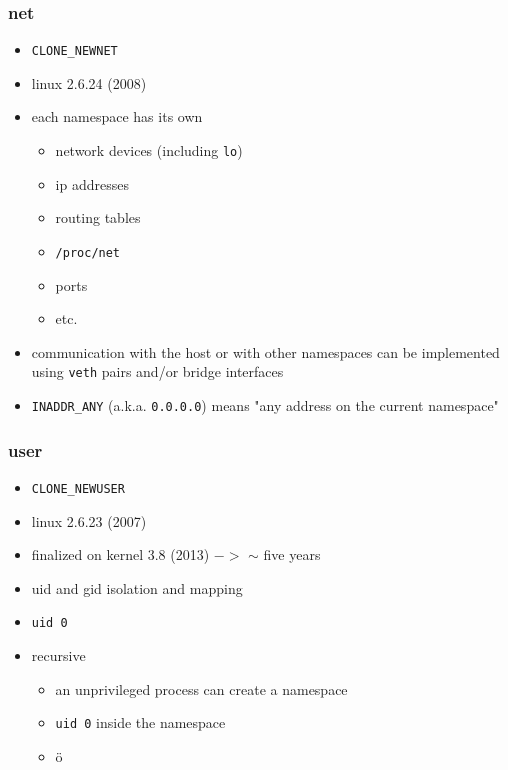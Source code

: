 \documentclass{beamer}
\begin{document}
\begin{frame}
    \frametitle{net}
    \begin{itemize}
        \item \texttt{CLONE\_NEWNET}
        \item linux 2.6.24 (2008)
        \item each namespace has its own
            \begin{itemize}
                \item network devices (including \texttt{lo})
                \item ip addresses
                \item routing tables
                \item \texttt{/proc/net}
                \item ports
                \item etc.
            \end{itemize}
        \item
            communication with the host or with other namespaces can be
            implemented using \texttt{veth} pairs and/or bridge interfaces
        \item
            \texttt{INADDR\_ANY} (a.k.a. \texttt{0.0.0.0}) means "any address
            on the current namespace"
    \end{itemize}
\end{frame}

\begin{frame}
    \frametitle{user}
    \begin{itemize}
        \item \texttt{CLONE\_NEWUSER}
        \item linux 2.6.23 (2007)
        \item finalized on kernel 3.8 (2013) $->$ $\sim$ five years
        \item uid and gid isolation and mapping
        \item \texttt{uid 0}
        \item recursive
        \begin{itemize}
            \item an unprivileged process can create a namespace
            \item \texttt{uid 0} inside the namespace
            \item<2> ö
        \end{itemize}
    \end{itemize}
\end{frame}
\end{document}
